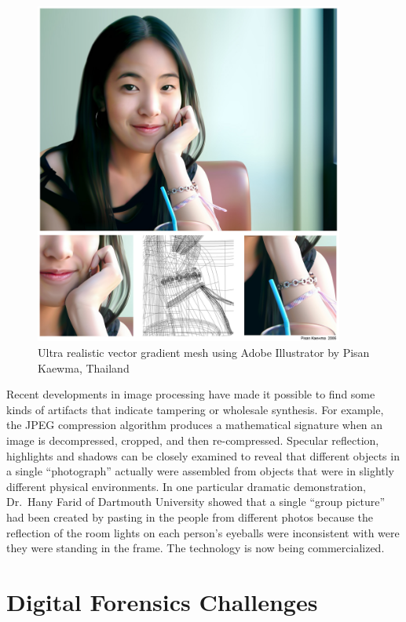 \begin{figure}
\includegraphics[width=4in]{art/a1336.jpg}
\caption{Ultra realistic vector gradient mesh using Adobe Illustrator by Pisan Kaewma, Thailand}\label{ultra-realistic}
\end{figure}

Recent developments in image processing have made it
possible to find some kinds of artifacts that indicate tampering or wholesale synthesis. For example,
the JPEG compression algorithm produces a mathematical signature when an
image is decompressed, cropped, and then re-compressed. Specular 
reflection, highlights and shadows can be closely examined to reveal
that different objects in a single ``photograph'' actually were
assembled from objects that were in 
slightly different physical environments. In one particular dramatic
demonstration, Dr.\ Hany Farid of Dartmouth University showed that a single ``group picture''
had been created by pasting in the people from different photos
because the reflection of the room lights on each person's eyeballs
were inconsistent with were they were standing in the frame. The technology is now
being commercialized\citep{farid07}.


\section{Digital Forensics Challenges \TODO}

